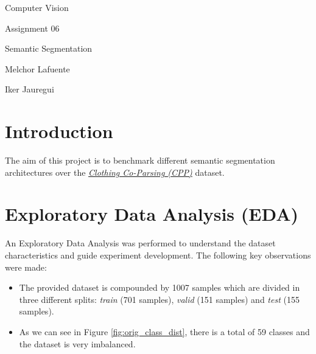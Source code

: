 \documentclass[12pt,a4paper]{article}
\begin{document}

\begin{titlepage}
    \centering
    \vspace*{\fill}
    {\LARGE Computer Vision\par}
    {\LARGE Assignment 06\par}
    \vspace{1cm}
    {\LARGE Semantic Segmentation\par}
    \vspace{1cm}
    {\large Melchor Lafuente\par}
    {\large Iker Jauregui \par}
    \vspace*{\fill}
\end{titlepage}

\newpage



\tableofcontents
\newpage

\section{Introduction}

The aim of this project is to benchmark different semantic segmentation architectures over the \href{https://huggingface.co/datasets/cayala/CCP}{\textit{Clothing Co-Parsing (CPP)}} dataset.

\section{Exploratory Data Analysis (EDA)}

An Exploratory Data Analysis was performed to understand the dataset characteristics and guide experiment development. The following key observations were made:

\begin{itemize}
    \item The provided dataset is compounded by 1007 samples which are divided in three different splits: \textit{train} (701 samples), \textit{valid} (151 samples) and \textit{test} (155 samples).
    \item As we can see in Figure \ref{fig:orig_class_dist}, there is a total of 59 classes and the dataset is very imbalanced.
\end{itemize}
\end{document}
